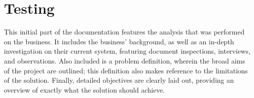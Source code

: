 \clearpage

\part{Testing} %
\label{prt:testing_}
This initial part of the documentation features the analysis that was performed on the business. It includes the business' background, as well as an in-depth investigation on their current system, featuring document inspections, interviews, and observations. Also included is a problem definition, wherein the broad aims of the project are outlined; this definition also makes reference to the limitations of the solution. Finally, detailed objectives are clearly laid out, providing an overview of exactly what the solution should achieve.








